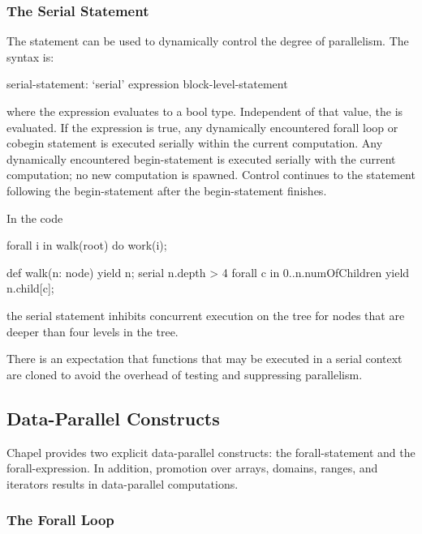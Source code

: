 \subsubsection{The Serial Statement}
\label{Serial}

The  statement can be used to dynamically control the
degree of parallelism.  The syntax is:
\begin{syntax}
serial-statement:
  `serial' expression block-level-statement
\end{syntax}
where the expression evaluates to a bool type.  Independent of that
value, the  is evaluated. If the
expression is true, any dynamically encountered forall loop or cobegin
statement is executed serially within the current computation.  Any
dynamically encountered begin-statement is executed serially with the
current computation; no new computation is spawned.  Control continues
to the statement following the begin-statement after the
begin-statement finishes.

\begin{example}
In the code
\begin{chapel}
forall i in walk(root) do
  work(i);

def walk(n: node) {
  yield n;
  serial n.depth > 4 forall c in 0..n.numOfChildren {
      yield n.child[c];
  }
}
\end{chapel}
the serial statement inhibits concurrent execution on the tree for
nodes that are deeper than four levels in the tree.
\end{example}

There is an expectation that functions that may be executed in a
serial context are cloned to avoid the overhead of testing and
suppressing parallelism.

\subsection{Data-Parallel Constructs}
\label{data_parallelism}

Chapel provides two explicit data-parallel constructs: the
forall-statement and the forall-expression.  In addition, promotion
over arrays, domains, ranges, and iterators results in data-parallel
computations.

\subsubsection{The Forall Loop}
\label{Forall}

